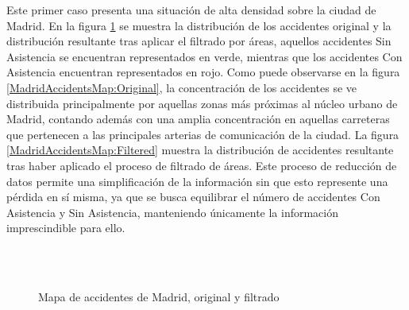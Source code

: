 Este primer caso presenta una situación de alta densidad sobre la ciudad de Madrid. En la figura \ref{MadridAccidentsMap} se muestra la distribución de los accidentes original y la distribución resultante tras aplicar el filtrado por áreas, aquellos accidentes Sin Asistencia se encuentran representados en verde, mientras que los accidentes Con Asistencia encuentran representados en rojo. Como puede observarse en la figura \ref{MadridAccidentsMap:Original}, la concentración de los accidentes se ve distribuida principalmente por aquellas zonas más próximas al núcleo urbano de Madrid, contando además con una amplia concentración en aquellas carreteras que pertenecen a las principales arterias de comunicación de la ciudad. La figura  \ref{MadridAccidentsMap:Filtered} muestra la distribución de accidentes resultante tras haber aplicado el proceso de filtrado de áreas. Este proceso de reducción de datos permite una simplificación de la información sin que esto represente una pérdida en sí misma, ya que se busca equilibrar el número de accidentes Con Asistencia y Sin Asistencia, manteniendo únicamente la información imprescindible para ello.

\begin{figure}[H]
	\centering
	\\
	\\
	\caption{Mapa de accidentes de Madrid, original y filtrado}
	\label{MadridAccidentsMap}
\end{figure}

